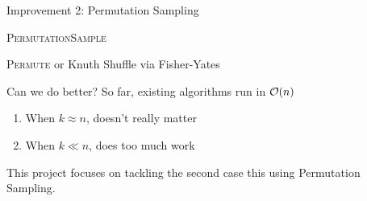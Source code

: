 %
%
%

\begin{frame}{Improvement 2: Permutation Sampling}
  \begin{algorithm}[H]
    \caption{\textsc{PermutationSample}}
  \begin{algorithmic}

  \end{algorithmic}
  \end{algorithm}

  \begin{algorithm}[H]
    \caption{\textsc{Permute} or Knuth Shuffle via Fisher-Yates}
  \begin{algorithmic}
    \EndFor
  \end{algorithmic}
  \end{algorithm}
\end{frame}

\begin{frame}{Can we do better?}
  So far, existing algorithms run in \(\mathcal{O}(n)\)
  \begin{enumerate}
    \item When \(k \approx n\), doesn't really matter
    \item When \(k \ll n\), does too much work
  \end{enumerate}

  This project focuses on tackling the second case this using Permutation Sampling.
\end{frame}

